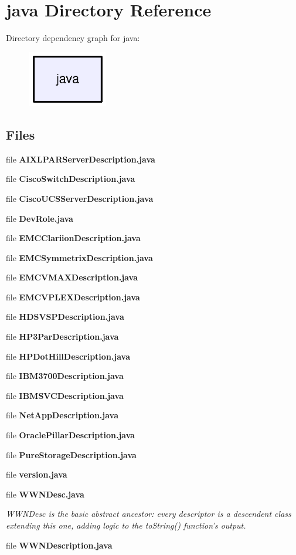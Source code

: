 \section{java Directory Reference}
\label{dir_93c6ba7fb77bae0709fae89c9c13b44a}
Directory dependency graph for java\+:\nopagebreak
\begin{figure}[H]
\begin{center}
\leavevmode
\includegraphics[width=98pt]{dir_93c6ba7fb77bae0709fae89c9c13b44a_dep}
\end{center}
\end{figure}
\subsection*{Files}
\begin{DoxyCompactItemize}
\item 
file {\bfseries A\+I\+X\+L\+P\+A\+R\+Server\+Description.\+java}
\item 
file {\bfseries Cisco\+Switch\+Description.\+java}
\item 
file {\bfseries Cisco\+U\+C\+S\+Server\+Description.\+java}
\item 
file {\bf Dev\+Role.\+java}
\item 
file {\bf E\+M\+C\+Clariion\+Description.\+java}
\item 
file {\bf E\+M\+C\+Symmetrix\+Description.\+java}
\item 
file {\bf E\+M\+C\+V\+M\+A\+X\+Description.\+java}
\item 
file {\bf E\+M\+C\+V\+P\+L\+E\+X\+Description.\+java}
\item 
file {\bf H\+D\+S\+V\+S\+P\+Description.\+java}
\item 
file {\bf H\+P3\+Par\+Description.\+java}
\item 
file {\bf H\+P\+Dot\+Hill\+Description.\+java}
\item 
file {\bf I\+B\+M3700\+Description.\+java}
\item 
file {\bf I\+B\+M\+S\+V\+C\+Description.\+java}
\item 
file {\bf Net\+App\+Description.\+java}
\item 
file {\bf Oracle\+Pillar\+Description.\+java}
\item 
file {\bfseries Pure\+Storage\+Description.\+java}
\item 
file {\bf version.\+java}
\item 
file {\bf W\+W\+N\+Desc.\+java}
\begin{DoxyCompactList}\small\item\em W\+W\+N\+Desc is the basic abstract ancestor\+: every descriptor is a descendent class extending this one, adding logic to the to\+String() function's output. \end{DoxyCompactList}\item 
file {\bf W\+W\+N\+Description.\+java}
\end{DoxyCompactItemize}

